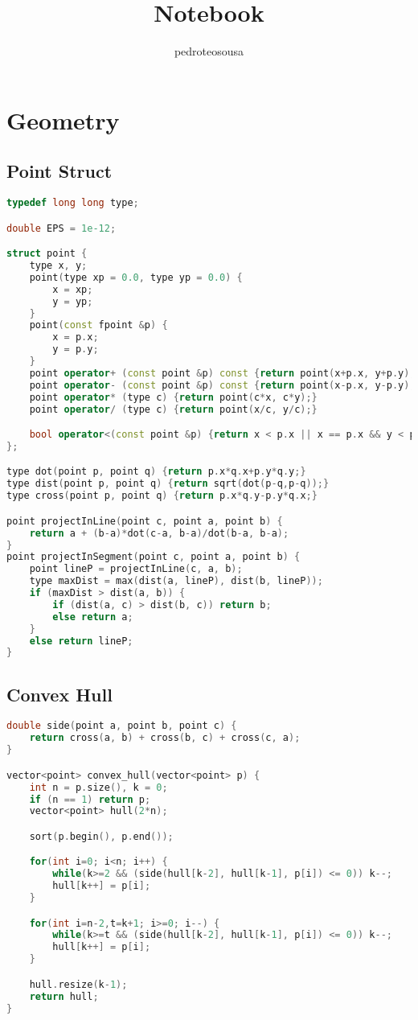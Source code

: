 \documentclass{article}
\title{Notebook}
\author{pedroteosousa }
\date{}
\begin{document}
\maketitle
\tableofcontents

\section{Geometry}
\subsection{Point Struct}
\begin{lstlisting}[language=C++]
typedef long long type;

double EPS = 1e-12;

struct point {
    type x, y;
    point(type xp = 0.0, type yp = 0.0) {
        x = xp;
        y = yp;
    }
    point(const fpoint &p) {
        x = p.x;
        y = p.y;
    }
    point operator+ (const point &p) const {return point(x+p.x, y+p.y);}
    point operator- (const point &p) const {return point(x-p.x, y-p.y);}
    point operator* (type c) {return point(c*x, c*y);}
    point operator/ (type c) {return point(x/c, y/c);}

    bool operator<(const point &p) {return x < p.x || x == p.x && y < p.y;}
};

type dot(point p, point q) {return p.x*q.x+p.y*q.y;}
type dist(point p, point q) {return sqrt(dot(p-q,p-q));}
type cross(point p, point q) {return p.x*q.y-p.y*q.x;}

point projectInLine(point c, point a, point b) {
	return a + (b-a)*dot(c-a, b-a)/dot(b-a, b-a);
}
point projectInSegment(point c, point a, point b) {
    point lineP = projectInLine(c, a, b);
    type maxDist = max(dist(a, lineP), dist(b, lineP));
    if (maxDist > dist(a, b)) {
        if (dist(a, c) > dist(b, c)) return b;
        else return a;
    }
    else return lineP;
}\end{lstlisting}
\subsection{Convex Hull}
\begin{lstlisting}[language=C++]
double side(point a, point b, point c) {
    return cross(a, b) + cross(b, c) + cross(c, a);
}

vector<point> convex_hull(vector<point> p) {
    int n = p.size(), k = 0;
    if (n == 1) return p;
    vector<point> hull(2*n);

    sort(p.begin(), p.end());

    for(int i=0; i<n; i++) {
        while(k>=2 && (side(hull[k-2], hull[k-1], p[i]) <= 0)) k--;
        hull[k++] = p[i];
    }

    for(int i=n-2,t=k+1; i>=0; i--) {
        while(k>=t && (side(hull[k-2], hull[k-1], p[i]) <= 0)) k--;
        hull[k++] = p[i];
    }

    hull.resize(k-1);
    return hull;
}\end{lstlisting}
\end{document}
